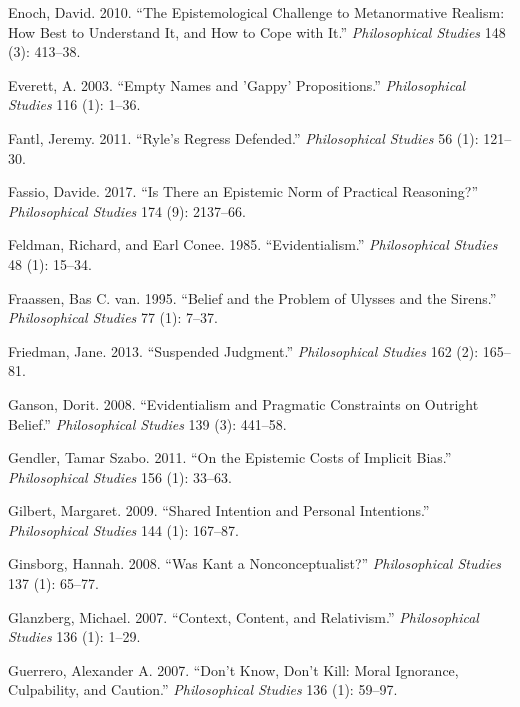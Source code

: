 \documentclass[
  10pt,
  letterpaper,
  DIV=11,
  numbers=noendperiod,
  twoside]{scrartcl}
\newlength{\cslhangindent}
\newenvironment{CSLReferences}[2] %
 {\begin{list}{}{%
  \setlength{\itemindent}{0pt}
  \setlength{\leftmargin}{0pt}
  \setlength{\parsep}{0pt}
  \ifodd #1
   \setlength{\leftmargin}{\cslhangindent}
   \setlength{\itemindent}{-1\cslhangindent}
  \fi
  \setlength{\itemsep}{#2\baselineskip}}}
 {\end{list}}
\begin{document}
\begin{CSLReferences}{1}{0}
Enoch, David. 2010. {``The Epistemological Challenge to Metanormative
Realism: How Best to Understand It, and How to Cope with It.''}
\emph{Philosophical Studies} 148 (3): 413--38.

Everett, A. 2003. {``Empty Names and 'Gappy' Propositions.''}
\emph{Philosophical Studies} 116 (1): 1--36.

Fantl, Jeremy. 2011. {``Ryle's Regress Defended.''} \emph{Philosophical
Studies} 56 (1): 121--30.

Fassio, Davide. 2017. {``Is There an Epistemic Norm of Practical
Reasoning?''} \emph{Philosophical Studies} 174 (9): 2137--66.

Feldman, Richard, and Earl Conee. 1985. {``Evidentialism.''}
\emph{Philosophical Studies} 48 (1): 15--34.

Fraassen, Bas C. van. 1995. {``Belief and the Problem of Ulysses and the
Sirens.''} \emph{Philosophical Studies} 77 (1): 7--37.

Friedman, Jane. 2013. {``Suspended Judgment.''} \emph{Philosophical
Studies} 162 (2): 165--81.

Ganson, Dorit. 2008. {``Evidentialism and Pragmatic Constraints on
Outright Belief.''} \emph{Philosophical Studies} 139 (3): 441--58.

Gendler, Tamar Szabo. 2011. {``On the Epistemic Costs of Implicit
Bias.''} \emph{Philosophical Studies} 156 (1): 33--63.

Gilbert, Margaret. 2009. {``Shared Intention and Personal Intentions.''}
\emph{Philosophical Studies} 144 (1): 167--87.

Ginsborg, Hannah. 2008. {``Was Kant a Nonconceptualist?''}
\emph{Philosophical Studies} 137 (1): 65--77.

Glanzberg, Michael. 2007. {``Context, Content, and Relativism.''}
\emph{Philosophical Studies} 136 (1): 1--29.

Guerrero, Alexander A. 2007. {``Don't Know, Don't Kill: Moral Ignorance,
Culpability, and Caution.''} \emph{Philosophical Studies} 136 (1):
59--97.


\end{CSLReferences}
\end{document}
